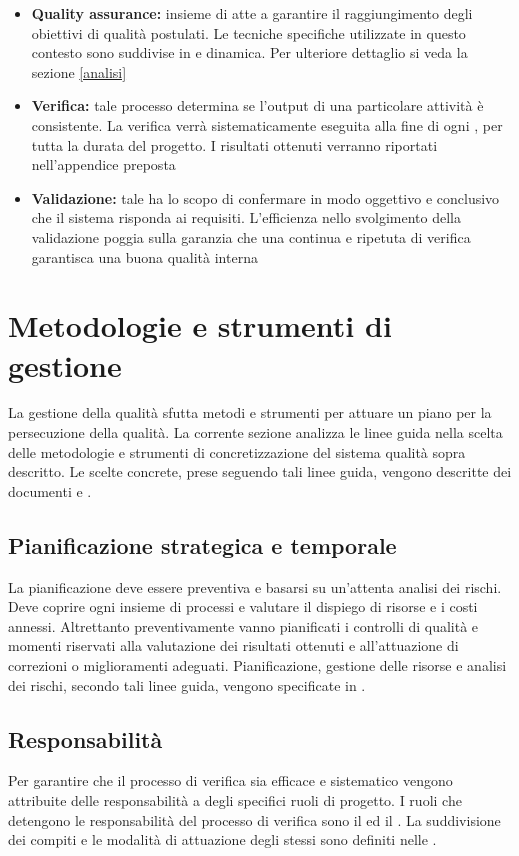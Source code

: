 \documentclass[12pt,a4paper]{article}
\begin{document}
	\begin{itemize}
		\item \textbf{Quality assurance:} insieme di  atte a garantire il raggiungimento degli obiettivi di qualità postulati. Le tecniche specifiche utilizzate in questo contesto sono suddivise in  e dinamica. Per ulteriore dettaglio si veda la sezione \ref{analisi}
		\item \textbf{Verifica:} tale processo determina se l'output di una particolare attività è consistente. La verifica verrà sistematicamente eseguita alla fine di ogni , per tutta la durata del progetto. I risultati ottenuti verranno riportati nell'appendice preposta
		\item \textbf{Validazione:} tale   ha lo scopo di confermare in modo oggettivo e conclusivo che il sistema risponda ai requisiti. L'efficienza nello svolgimento della validazione poggia sulla garanzia che una continua e ripetuta  di verifica garantisca una buona qualità interna
	\end{itemize}
	
	\newpage
	\section{Metodologie e strumenti di gestione} \label{gest_qual}
	
	La gestione della qualità sfutta metodi e strumenti per attuare un piano per la  persecuzione della qualità. 
	 La corrente sezione analizza le linee guida nella scelta delle metodologie e strumenti di concretizzazione del sistema qualità sopra descritto. Le scelte concrete, prese seguendo tali linee guida, vengono descritte dei documenti \PdP{} e \NdP{}.
	
	\subsection{Pianificazione strategica e temporale}
	La pianificazione deve essere preventiva e basarsi su un'attenta analisi dei rischi. Deve coprire ogni insieme di processi e valutare il dispiego di risorse e i costi annessi. Altrettanto preventivamente vanno pianificati i controlli di qualità e momenti riservati alla valutazione dei risultati ottenuti e all'attuazione di correzioni o miglioramenti adeguati.
	Pianificazione, gestione delle risorse e analisi dei rischi, secondo tali linee guida, vengono specificate in \PdP{}.
		
	\subsection{Responsabilità}
	Per garantire che il processo di verifica sia efficace e sistematico vengono attribuite delle
	responsabilità a degli specifici ruoli di progetto.
	I ruoli che detengono le responsabilità del processo di verifica sono il \PM{} ed il \VR{}. La suddivisione dei compiti e le modalità di attuazione degli
	stessi sono definiti nelle \NdP{}.
	
\end{document}
